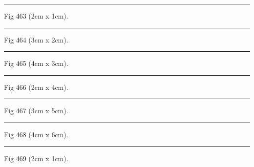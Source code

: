 \documentclass[a4paper,11pt]{article}
\begin{document}
\begin{swarmwrap}%
  \begin{minipage}[t]{2cm}
    \centering
    \rule{\linewidth}{1cm}
    {\footnotesize Fig 463 (2cm x 1cm).}
  \end{minipage}%
\end{swarmwrap}%
\swarmwrapnext
\lipsum[13]%

\begin{swarmwrap}%
  \begin{minipage}[t]{3cm}
    \centering
    \rule{\linewidth}{2cm}
    {\footnotesize Fig 464 (3cm x 2cm).}
  \end{minipage}%
\end{swarmwrap}%
\swarmwrapnext
\lipsum[14]%

\begin{swarmwrap}%
  \begin{minipage}[t]{4cm}
    \centering
    \rule{\linewidth}{3cm}
    {\footnotesize Fig 465 (4cm x 3cm).}
  \end{minipage}%
\end{swarmwrap}%
\swarmwrapnext
\lipsum[15]%

\begin{swarmwrap}%
  \begin{minipage}[t]{2cm}
    \centering
    \rule{\linewidth}{4cm}
    {\footnotesize Fig 466 (2cm x 4cm).}
  \end{minipage}%
\end{swarmwrap}%
\swarmwrapnext
\lipsum[16]%

\begin{swarmwrap}%
  \begin{minipage}[t]{3cm}
    \centering
    \rule{\linewidth}{5cm}
    {\footnotesize Fig 467 (3cm x 5cm).}
  \end{minipage}%
\end{swarmwrap}%
\swarmwrapnext
\lipsum[17]%

\begin{swarmwrap}%
  \begin{minipage}[t]{4cm}
    \centering
    \rule{\linewidth}{6cm}
    {\footnotesize Fig 468 (4cm x 6cm).}
  \end{minipage}%
\end{swarmwrap}%
\swarmwrapnext
\lipsum[18]%

\begin{swarmwrap}%
  \begin{minipage}[t]{2cm}
    \centering
    \rule{\linewidth}{1cm}
    {\footnotesize Fig 469 (2cm x 1cm).}
  \end{minipage}%
\end{swarmwrap}%
\swarmwrapnext
\lipsum[19]%
\end{document}

